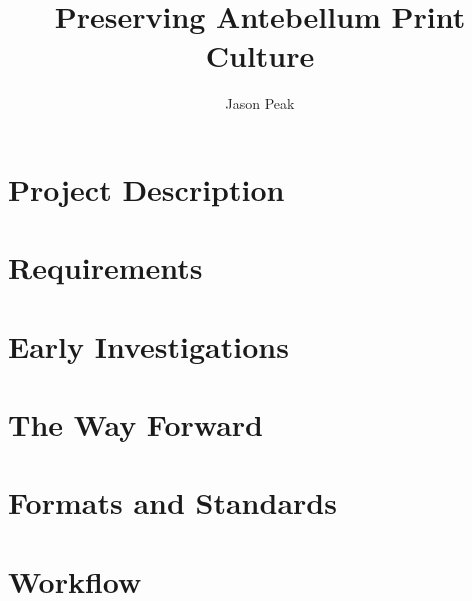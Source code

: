 \documentclass[oneside]{article}
\begin{document}
\title{Preserving Antebellum Print Culture}
\author{Jason Peak}
\maketitle


\def\projectname{Poe's Magazine World}
\def\apc{Antebellum Print Culture}
\def\bwj{\emph{The Broadway Journal}}
\def\slm{\emph{Southern Literary Messenger}}
\def\bgm{\emph{Burton's Gentleman's Magazine}}
\def\gm{\emph{Graham's Magazine}}
\def\maglist{\bgm, \bwj, \gm, and the \slm}

\def\needcite{[citation]}
\def\needswork{[needs much work for inclusion]}

\begin{abstract}

\end{abstract}

\section{Project Description}


%


\section{Requirements}


\section{Early Investigations}


\section{The Way Forward}


\section{Formats and Standards}


\section{Workflow}

\end{document}
